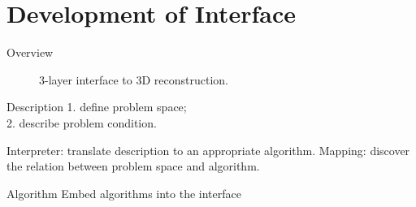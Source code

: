 \documentclass[10pt]{beamer}
\begin{document}
\section{Development of Interface}
\begin{frame}{Overview}
\begin{figure}
\centering
{}
\caption{3-layer interface to 3D reconstruction.}
\end{figure}

\begin{exampleblock}{Description}
  1. define problem space; \\
  2. describe problem condition.
\end{exampleblock}
\begin{exampleblock}{Interpreter: translate description to an appropriate algorithm.}
  Mapping: discover the relation between problem space and algorithm.
\end{exampleblock}
\begin{exampleblock}{Algorithm}
  Embed algorithms into the interface
\end{exampleblock}

\end{frame}

\end{document}
